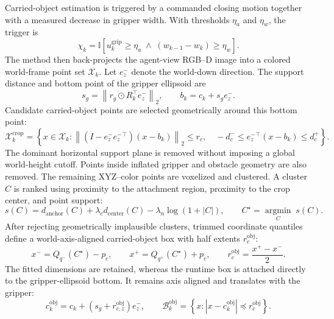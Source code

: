 Carried-object estimation is triggered by a commanded closing motion together with a measured decrease in gripper width. With thresholds $\eta_a$ and $\eta_w$, the trigger is
\begin{equation}
    \chi_k
    =\mathbb{I}\!\left[
        u^{\mathrm{grip}}_k\geq\eta_a
        \;\land\;
        \left(w_{k-1}-w_k\right)\geq\eta_w
    \right].
\end{equation}
The method then back-projects the agent-view RGB--D image into a colored world-frame point set $\mathcal{X}_k$. Let $e_z^{-}$ denote the world-down direction. The support distance and bottom point of the gripper ellipsoid are
\begin{equation}
    s_g=\left\|r_g\odot R_k^{\top}e_z^{-}\right\|_2,
    \qquad
    b_k=c_k+s_g e_z^{-}.
\end{equation}
Candidate carried-object points are selected geometrically around this bottom point:
\begin{equation}
    \mathcal{X}^{\mathrm{crop}}_k
    =\left\{
        x\in\mathcal{X}_k:
        \left\|(I-e_z^{-}{e_z^{-}}^{\top})(x-b_k)\right\|_2\leq r_c,
        \quad
        -d_c^{-}\leq {e_z^{-}}^{\top}(x-b_k)\leq d_c^{+}
    \right\}.
\end{equation}
The dominant horizontal support plane is removed without imposing a global world-height cutoff. Points inside inflated gripper and obstacle geometry are also removed. The remaining XYZ--color points are voxelized and clustered. A cluster $C$ is ranked using proximity to the attachment region, proximity to the crop center, and point support:
\begin{equation}
    s(C)
    =d_{\mathrm{anchor}}(C)
    +\lambda_c d_{\mathrm{center}}(C)
    -\lambda_n\log\!\left(1+|C|\right),
    \qquad
    C^{\star}=\underset{C}{\operatorname{argmin}}\;s(C).
\end{equation}
After rejecting geometrically implausible clusters, trimmed coordinate quantiles define a world-axis-aligned carried-object box with half extents $r_c^{\mathrm{obj}}$:
\begin{equation}
    x^{-}=Q_{q^{-}}(C^{\star})-p_c,
    \qquad
    x^{+}=Q_{q^{+}}(C^{\star})+p_c,
    \qquad
    r_c^{\mathrm{obj}}=\frac{x^{+}-x^{-}}{2}.
\end{equation}
The fitted dimensions are retained, whereas the runtime box is attached directly to the gripper-ellipsoid bottom. It remains axis aligned and translates with the gripper:
\begin{equation}
    c^{\mathrm{obj}}_k
    =c_k+\left(s_g+r^{\mathrm{obj}}_{c,z}\right)e_z^{-},
    \qquad
    \mathcal{B}^{\mathrm{obj}}_k
    =\left\{x:\left|x-c^{\mathrm{obj}}_k\right|\preceq r_c^{\mathrm{obj}}\right\}.
\end{equation}
